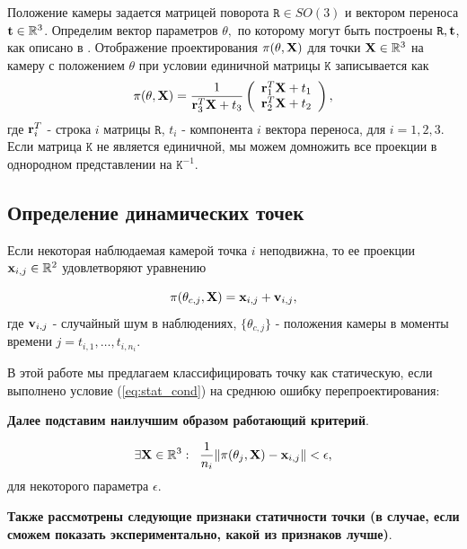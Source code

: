\documentclass[conference]{IEEEtran}
\begin{document}
Положение камеры задается матрицей поворота $\mathtt{R} \in SO(3)$ и вектором переноса ${\bf t} \in \mathbb{R}^3$.  Определим вектор параметров $\theta,$ по которому могут быть построены $\mathtt{R}, {\bf t}$, как описано в \cite{}. Отображение проектирования $\pi(\theta, {\bf X})$ для точки ${\bf X} \in \mathbb{R}^3$ на камеру с положением $\theta$ при условии единичной матрицы $\mathtt{K}$ записывается как
\begin{equation}\label{eq:proj_fun}
\pi(\theta, {\bf X}) = 
\frac{1}{{\bf r}_3^T {\bf X} + t_3}
\left( 
\begin{array}{c}
 {\bf r}_1^T {\bf X} + t_1 \\
{\bf r}_2^T {\bf X} + t_2
\end{array}
\right),
\end{equation}
где ${\bf r}_i^T$ - строка $i$ матрицы $\mathtt{R}$, $t_i$ - компонента $i$ вектора переноса, для $i = 1,2,3.$ Если матрица $\mathtt{K}$ не является единичной, мы можем домножить все проекции в однородном представлении на $\mathtt{K}^{-1}$.

\subsection{Определение динамических точек}
Если некоторая наблюдаемая камерой точка $i$ неподвижна, то ее проекции ${\bf x}_{i,j} \in \mathbb{R}^2$ удовлетворяют уравнению

\begin{equation}
\label{eq:proj_stat}
\pi(\theta_{c,j}, {\bf X}) = {\bf x}_{i,j} + {\bf v}_{i,j},
\end{equation}
где ${\bf v}_{i,j}$ - случайный шум в наблюдениях, $\{ \theta_{c,j} \}$ - положения камеры в моменты времени $j =t_{i,1}, \ldots, t_{i,n_i}$. 

В этой работе мы предлагаем классифицировать точку как статическую, если выполнено условие (\ref{eq:stat_cond}) на среднюю ошибку перепроектирования:

{\bf Далее подставим наилучшим образом работающий критерий}.

\begin{equation}\label{eq:stat_cond}
\exists {\bf X} \in \mathbb{R}^3: \; \; \frac{1}{n_i} \|\pi(\theta_j, {\bf X}) - {\bf x}_{i,j} \| < \epsilon,
\end{equation}
для некоторого параметра $\epsilon$.

{\bf Также рассмотрены следующие признаки статичности точки (в случае, если сможем показать экспериментально, какой из признаков лучше)}.
\end{document}
